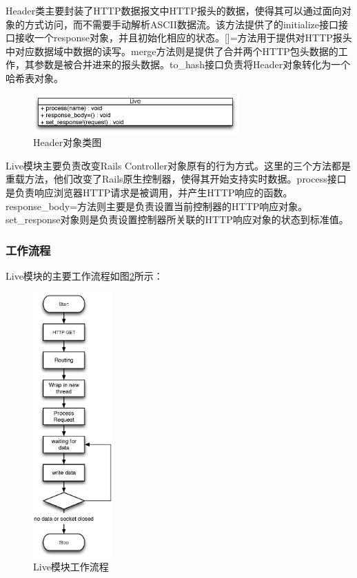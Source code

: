 Header类主要封装了HTTP数据报文中HTTP报头的数据，使得其可以通过面向对象的方式访问，而不需要手动解析ASCII数据流。该方法提供了的initialize接口接口接收一个response对象，并且初始化相应的状态。[]=方法用于提供对HTTP报头中对应数据域中数据的读写。merge方法则是提供了合并两个HTTP包头数据的工作，其参数是被合并进来的报头数据。to\_hash接口负责将Header对象转化为一个哈希表对象。

\begin{figure}[h]
\centering
\includegraphics[width=0.7\textwidth]{images/detail/live_class.eps}
\caption{Header对象类图}
\label{fig-live-class}
\end{figure}

Live模块主要负责改变Rails Controller对象原有的行为方式。这里的三个方法都是重载方法，他们改变了Rails原生控制器，使得其开始支持实时数据。process接口是负责响应浏览器HTTP请求是被调用，并产生HTTP响应的函数。response\_body=方法则主要是负责设置当前控制器的HTTP响应对象。set\_response对象则是负责设置控制器所关联的HTTP响应对象的状态到标准值。

\subsubsection{工作流程}
Live模块的主要工作流程如图\ref{fig-live-process}所示：

\begin{figure}[h]
\centering
\includegraphics[width=0.27\textwidth]{images/detail/live-process.eps}
\caption{Live模块工作流程}
\label{fig-live-process}
\end{figure}

